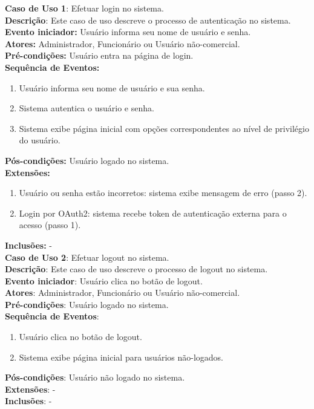 \documentclass[]{politex}
\begin{document}
\noindent \textbf{Caso de Uso 1}: Efetuar login no sistema. \\
\textbf{Descrição}: Este caso de uso descreve o processo de autenticação no sistema. \\
\textbf{Evento iniciador:} Usuário informa seu nome de usuário e senha. \\
\textbf{Atores:} Administrador, Funcionário ou Usuário não-comercial. \\
\textbf{Pré-condições:} Usuário entra na página de login. \\
\textbf{Sequência de Eventos:}
\begin{enumerate}
\item Usuário informa seu nome de usuário e sua senha.
\item Sistema autentica o usuário e senha.
\item Sistema exibe página inicial com opções correspondentes ao nível de privilégio do usuário.
\end{enumerate}
\textbf{Pós-condições:} Usuário logado no sistema. \\
\textbf{Extensões:}
\begin{enumerate}
\item Usuário ou senha estão incorretos: sistema exibe mensagem de erro (passo 2).
\item Login por OAuth2: sistema recebe token de autenticação externa para o acesso (passo 1).
\end{enumerate}
\textbf{Inclusões:} - \\

\noindent \textbf{Caso de Uso 2}: Efetuar logout no sistema. \\
\textbf{Descrição}: Este caso de uso descreve o processo de logout no sistema. \\
\textbf{Evento iniciador}: Usuário clica no botão de logout. \\
\textbf{Atores}: Administrador, Funcionário ou Usuário não-comercial. \\
\textbf{Pré-condições}: Usuário logado no sistema. \\
\textbf{Sequência de Eventos}:
\begin{enumerate}
\item Usuário clica no botão de logout.
\item Sistema exibe página inicial para usuários não-logados.
\end{enumerate}
\textbf{Pós-condições}: Usuário não logado no sistema. \\
\textbf{Extensões}: - \\
\textbf{Inclusões}: - \\
\end{document}
